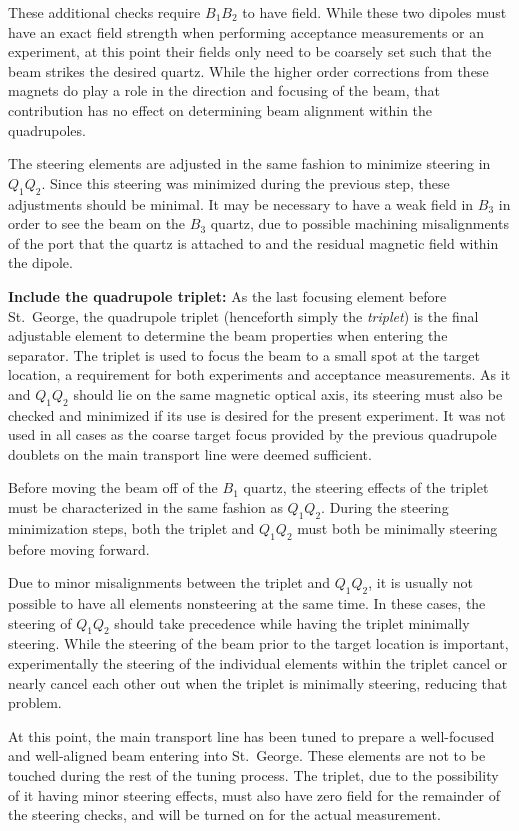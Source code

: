 These additional checks require $B_1B_2$ to have field. While these two
dipoles must have an exact field strength when performing acceptance
measurements or an experiment, at this point their fields only need to
be coarsely set such that the beam strikes the desired quartz. While the
higher order corrections from these magnets do play a role in the
direction and focusing of the beam, that contribution has no effect on
determining beam alignment within the quadrupoles.

The steering elements are adjusted in the same fashion to minimize
steering in $Q_1Q_2$. Since this steering was minimized during the
previous step, these adjustments should be minimal. It may be necessary
to have a weak field in $B_3$ in order to see the beam on the $B_3$
quartz, due to possible machining misalignments of the port that the
quartz is attached to and the residual magnetic field within the dipole.

\textbf{Include the quadrupole triplet:}
As the last focusing element before St.\ George, the quadrupole triplet
(henceforth simply the \emph{triplet}) is the final adjustable element
to determine the beam properties when entering the separator. The
triplet is used to focus the beam to a small spot at the target
location, a requirement for both experiments and acceptance
measurements. As it and $Q_1Q_2$ should lie on the same magnetic optical
axis, its steering must also be checked and minimized if its use is
desired for the present experiment. It was not used in all cases as the
coarse target focus provided by the previous quadrupole doublets on the
main transport line were deemed sufficient.

Before moving the beam off of the $B_1$ quartz, the steering effects of
the triplet must be characterized in the same fashion as $Q_1Q_2$.
During the steering minimization steps, both the triplet and $Q_1Q_2$
must both be minimally steering before moving forward.

Due to minor misalignments between the triplet and $Q_1Q_2$, it is
usually not possible to have all elements nonsteering at the same time.
In these cases, the steering of $Q_1Q_2$ should take precedence while
having the triplet minimally steering. While the steering of the beam
prior to the target location is important, experimentally the steering
of the individual elements within the triplet cancel or nearly cancel
each other out when the triplet is minimally steering, reducing that
problem.

At this point, the main transport line has been tuned to prepare a
well-focused and well-aligned beam entering into St.\ George. These
elements are not to be touched during the rest of the tuning process.
The triplet, due to the possibility of it having minor steering effects,
must also have zero field for the remainder of the steering checks, and
will be turned on for the actual measurement.

